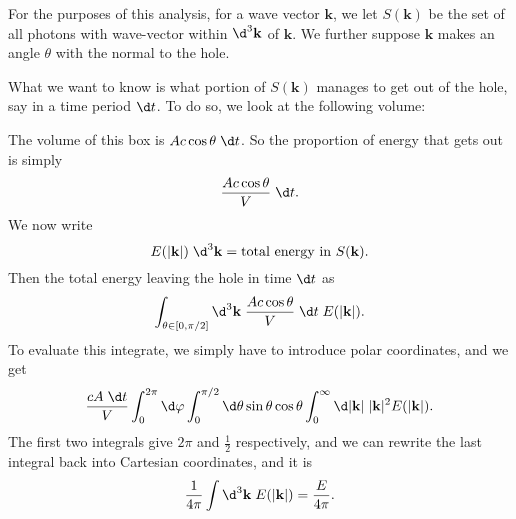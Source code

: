 \documentclass[a4paper]{article}
\begin{document}
For the purposes of this analysis, for a wave vector $\mathbf{k}$, we let $S(\mathbf{k})$ be the set of all photons with wave-vector within $\d^3 \mathbf{k}$ of $\mathbf{k}$. We further suppose $\mathbf{k}$ makes an angle $\theta$ with the normal to the hole.
\begin{center}
\end{center}
What we want to know is what portion of $S(\mathbf{k})$ manages to get out of the hole, say in a time period $\d t$. To do so, we look at the following volume:
\begin{center}
\end{center}
The volume of this box is $A c \cos \theta \;\d t$. So the proportion of energy that gets out is simply
\[
  \frac{A c \cos \theta}{V} \;\d t.
\]
We now write
\[
  E(|\mathbf{k}|) \;\d^3 \mathbf{k} = \text{total energy in $S(\mathbf{k})$}.
\]
Then the total energy leaving the hole in time $\d t$ as
\[
  \int_{\theta \in [0, \pi/2]} \d^3 \mathbf{k}\; \frac{A c \cos \theta}{V}\;\d t\; E(|\mathbf{k}|).
\]
To evaluate this integrate, we simply have to introduce polar coordinates, and we get
\[
  \frac{cA \;\d t}{V} \int_0^{2\pi}\d \varphi \int_0^{\pi/2} \d \theta \sin \theta \cos \theta \int_0^\infty \d |\mathbf{k}|\; |\mathbf{k}|^2 E(|\mathbf{k}|).
\]
The first two integrals give $2\pi$ and $\frac{1}{2}$ respectively, and we can rewrite the last integral back into Cartesian coordinates, and it is
\[
  \frac{1}{4\pi}\int \d^3 \mathbf{k}\; E(|\mathbf{k}|) = \frac{E}{4\pi}.
\]
\end{document}
